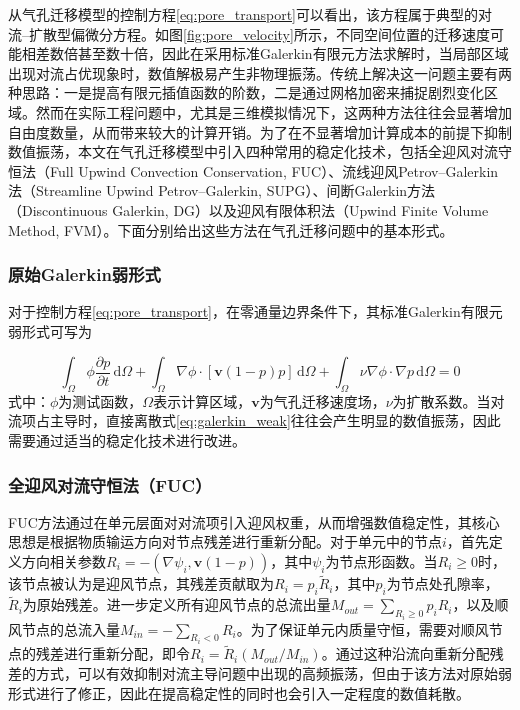 
从气孔迁移模型的控制方程\eqref{eq:pore_transport}可以看出，该方程属于典型的对流--扩散型偏微分方程。如图\ref{fig:pore_velocity}所示，不同空间位置的迁移速度可能相差数倍甚至数十倍，因此在采用标准Galerkin有限元方法求解时，当局部区域出现对流占优现象时，数值解极易产生非物理振荡。传统上解决这一问题主要有两种思路：一是提高有限元插值函数的阶数，二是通过网格加密来捕捉剧烈变化区域。然而在实际工程问题中，尤其是三维模拟情况下，这两种方法往往会显著增加自由度数量，从而带来较大的计算开销。为了在不显著增加计算成本的前提下抑制数值振荡，本文在气孔迁移模型中引入四种常用的稳定化技术，包括全迎风对流守恒法（Full Upwind Convection Conservation, FUC）、流线迎风Petrov--Galerkin法（Streamline Upwind Petrov--Galerkin, SUPG）、间断Galerkin方法（Discontinuous Galerkin, DG）以及迎风有限体积法（Upwind Finite Volume Method, FVM）。下面分别给出这些方法在气孔迁移问题中的基本形式。

\subsubsection{原始Galerkin弱形式}

对于控制方程\eqref{eq:pore_transport}，在零通量边界条件下，其标准Galerkin有限元弱形式可写为

\begin{equation}
	\int_\Omega
	\phi
	\frac{\partial p}{\partial t}
	\,\mathrm d\Omega
	+
	\int_\Omega
	\nabla \phi
	\cdot
	[\mathbf{v}(1-p)p]
	\,\mathrm d\Omega
	+
	\int_\Omega
	\nu
	\nabla \phi
	\cdot
	\nabla p
	\,\mathrm d\Omega
	=0 
	\label{eq:galerkin_weak}
\end{equation}
式中：$\phi$为测试函数，$\Omega$表示计算区域，$\mathbf v$为气孔迁移速度场，$\nu$为扩散系数。当对流项占主导时，直接离散式\eqref{eq:galerkin_weak}往往会产生明显的数值振荡，因此需要通过适当的稳定化技术进行改进。

\subsubsection{全迎风对流守恒法（FUC）}

FUC方法\cite{adhikaryAnalysisFiniteElement2011}通过在单元层面对对流项引入迎风权重，从而增强数值稳定性，其核心思想是根据物质输运方向对节点残差进行重新分配。对于单元中的节点$i$，首先定义方向相关参数$R_i=-(\nabla\psi_i,\mathbf v(1-p))$，其中$\psi_i$为节点形函数。当$R_i\ge0$时，该节点被认为是迎风节点，其残差贡献取为$R_i=p_i\tilde R_i$，其中$p_i$为节点处孔隙率，$\tilde R_i$为原始残差。进一步定义所有迎风节点的总流出量$M_{out}=\sum_{R_i\ge0}p_iR_i$，以及顺风节点的总流入量$M_{in}=-\sum_{R_i<0}R_i$。为了保证单元内质量守恒，需要对顺风节点的残差进行重新分配，即令$R_i=\tilde R_i(M_{out}/M_{in})$。通过这种沿流向重新分配残差的方式，可以有效抑制对流主导问题中出现的高频振荡，但由于该方法对原始弱形式进行了修正，因此在提高稳定性的同时也会引入一定程度的数值耗散。

